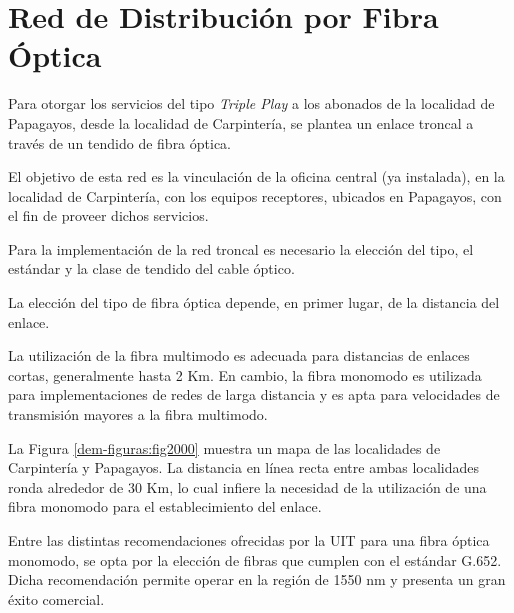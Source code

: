\section{Red de Distribución por Fibra Óptica}


Para otorgar los servicios del tipo \textit{Triple Play} a los abonados de la localidad de Papagayos, desde la localidad de Carpintería, se plantea un enlace troncal a través de un tendido de fibra óptica.

El objetivo de esta red es la vinculación de la oficina central (ya instalada), en la localidad de Carpintería, con los equipos receptores, ubicados en Papagayos, con el fin de  proveer dichos servicios.


Para la implementación de la red troncal es necesario la elección del tipo, el estándar y la clase de tendido del cable óptico.


La elección del tipo de fibra óptica depende, en primer lugar, de la distancia del enlace.


La utilización de la fibra multimodo es adecuada para distancias de enlaces cortas, generalmente hasta 2 Km.
En cambio, la fibra monomodo es utilizada para implementaciones de redes de larga distancia y es apta para velocidades de transmisión mayores a la fibra multimodo.


La Figura \ref{dem-figuras:fig2000} muestra un mapa de las localidades de Carpintería y Papagayos. La distancia en línea recta  entre ambas localidades ronda alrededor de 30 Km, lo cual infiere la necesidad de la utilización de una fibra monomodo para el establecimiento del enlace.







Entre las distintas recomendaciones ofrecidas por la UIT para una fibra óptica monomodo, se opta por la elección de fibras que cumplen con el estándar G.652. Dicha recomendación permite operar en la región de 1550 nm y presenta un gran éxito comercial.


